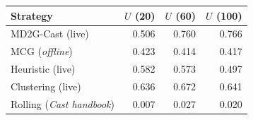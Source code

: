 \begin{tabular}{lrrr}
\hline
Strategy & $U$ (20) & $U$ (60) & $U$ (100) \\
\hline
MD2G-Cast (live) & 0.506 & 0.760 & 0.766 \\
MCG (\textit{offline}) & 0.423 & 0.414 & 0.417 \\
Heuristic (live) & 0.582 & 0.573 & 0.497 \\
Clustering (live) & 0.636 & 0.672 & 0.641 \\
Rolling (\textit{Cast handbook}) & 0.007 & 0.027 & 0.020 \\
\hline
\end{tabular}
